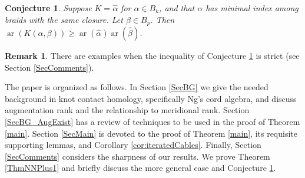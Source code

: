 \documentclass[11pt]{amsart}
\def\s{{\sigma}}
\def\ar{\operatorname{ar}}
\def\fp{{\scriptstyle \bar{\bar{p}}}}
\newtheorem{cor}[thm]{Corollary}
\newtheorem{conj}[thm]{Conjecture}
\theoremstyle{definition}
\newtheorem{rem}[thm]{Remark}
\begin{document}
\begin{conj}Suppose $K=\hat{\alpha}$ for $\alpha\in B_k$, and that $\alpha$ has minimal index among braids with the same closure. Let $\beta\in B_p$. Then $\ar(K(\alpha,\beta)) \ge \ar(\hat{\alpha})\ar(\hat{\beta})$.
\label{ConjSuperMultipl}
\end{conj}

\begin{rem}There are examples when the inequality of Conjecture \ref{ConjSuperMultipl} is strict (see Section \ref{SecComments}).
\label{RemStrictlySuper}
\end{rem}




The paper is organized as follows. In Section \ref{SecBG} we give the needed background in knot contact homology, specifically Ng's cord algebra, and discuss augmentation rank and the relationship to meridional rank. Section \ref{SecBG_AugExist} has a review of techniques to be used in the proof of Theorem \ref{main}. Section \ref{SecMain} is devoted to the proof of Theorem \ref{main}, its requisite supporting lemmas, and Corollary \ref{cor:iteratedCables}. Finally, Section \ref{SecComments} considers the sharpness of our results. We prove Theorem \ref{ThmNNPlus1} and briefly discuss the more general case and Conjecture \ref{ConjSuperMultipl}.



\end{document}

